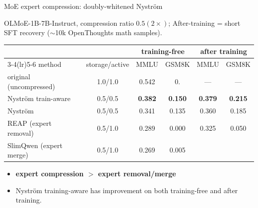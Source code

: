 \documentclass[9pt]{beamer}
\begin{document}
	\begin{frame}{MoE expert compression: doubly-whitened Nystr\"om}
		

		\vspace{0.5em}
		{\footnotesize OLMoE-1B-7B-Instruct, compression ratio $0.5 (2\times)$; After-training =
			short SFT recovery ($\sim$10k OpenThoughts math samples).}
		
		\vspace{0.2em}
		{\footnotesize
			\begin{tabular}{@{}lccccc@{}}
				\toprule
				& & \multicolumn{2}{c}{training-free} & \multicolumn{2}{c}{after training} \\
				\cmidrule(lr){3-4}\cmidrule(lr){5-6}
				method & storage/active & MMLU & GSM8K & MMLU & GSM8K \\
				\midrule
				original (uncompressed)     & 1.0/1.0 & 0.542 & 0.   & ---   & ---   \\
				\midrule
				Nystr\"om train-aware & 0.5/0.5 & \textbf{0.382} & \textbf{0.150} & \textbf{0.379} & \textbf{0.215} \\
				Nystr\"om        & 0.5/0.5 & 0.341 & 0.135 & 0.360 & 0.185 \\
				REAP (expert removal)           & 0.5/1.0 & 0.289 & 0.000 & 0.325 & 0.050 \\
				SlimQwen (expert merge)      & 0.5/1.0 & 0.269 & 0.005 &  &  \\
				\bottomrule
		\end{tabular}}
		
		\vspace{0.5em}
		\begin{itemize}
			\item \textbf{expert compression $>$ expert removal/merge}
			\item Nystr\"om training-aware has improvement on both training-free and after training.
		\end{itemize}
		
	\end{frame}
	
\end{document}
